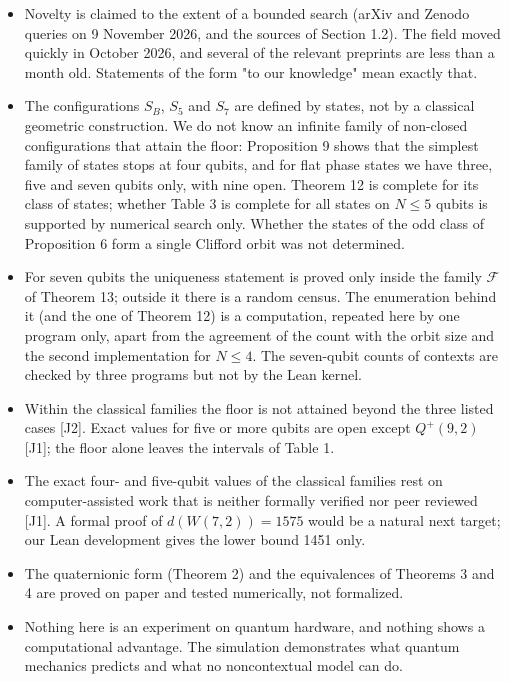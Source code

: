 \documentclass[11pt,a4paper]{article}
\providecommand{\tightlist}{\setlength{\itemsep}{0pt}\setlength{\parskip}{0pt}}
\begin{document}
\begin{itemize}
\tightlist
\item
  Novelty is claimed to the extent of a bounded search (arXiv and Zenodo queries on 9 November 2026,
  and the sources of Section 1.2). The field moved quickly in October 2026, and several of the relevant
  preprints are less than a month old. Statements of the form "to our knowledge" mean exactly that.
\item
  The configurations \(S_B\), \(S_5\) and \(S_7\) are defined by states, not by a classical geometric
  construction. We do not know an infinite family of non-closed configurations that attain the floor:
  Proposition 9 shows that the simplest family of states stops at four qubits, and for flat phase
  states we have three, five and seven qubits only, with nine open. Theorem 12 is complete for its class
  of states; whether Table 3 is complete for all states on \(N \le 5\) qubits is supported by numerical
  search only. Whether the states of the odd class of Proposition 6 form a single Clifford orbit was not
  determined.
\item
  For seven qubits the uniqueness statement is proved only inside the family \(\mathcal{F}\) of
  Theorem 13; outside it there is a random census. The enumeration behind it (and the one of
  Theorem 12) is a computation, repeated here by one program only, apart from the agreement of the
  count with the orbit size and the second implementation for \(N \le 4\). The seven-qubit counts of
  contexts are checked by three programs but not by the Lean kernel.
\item
  Within the classical families the floor is not attained beyond the three listed cases {[}J2{]}. Exact
  values for five or more qubits are open except \(Q^+(9,2)\) {[}J1{]}; the floor alone leaves the intervals
  of Table 1.
\item
  The exact four- and five-qubit values of the classical families rest on computer-assisted work that is
  neither formally verified nor peer reviewed {[}J1{]}. A formal proof of \(d(W(7,2)) = 1575\) would be a
  natural next target; our Lean development gives the lower bound 1451 only.
\item
  The quaternionic form (Theorem 2) and the equivalences of Theorems 3 and 4 are proved on paper and
  tested numerically, not formalized.
\item
  Nothing here is an experiment on quantum hardware, and nothing shows a computational advantage.
  The simulation demonstrates what quantum mechanics predicts and what no noncontextual model can do.
\end{itemize}
\end{document}
